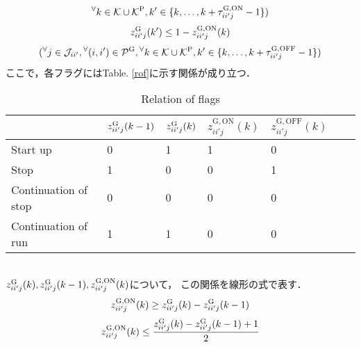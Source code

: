 \begin{itemize}
\begin{equation}
\begin{split}
			{}^{\forall} k \in \mathcal{K} \cup \mathcal{K}^{\rm P} ,%
			k' \in \{ k , \hdots , k + \tau^{\rm G,ON}_{ii'j} - 1 \} ) \nonumber
		\end{split}	
		\end{equation}
%		
		\begin{equation}
			z^{\rm G}_{ii'j}(k') \leq 1 - z_{ii'j}^{\mathrm {G,ON}} (k) 
		\end{equation}	
%		
		\begin{equation}
		\begin{split}
			( {}^{\forall} j \in \mathcal{J}_{ii'} , {}^\forall(i,i') \in \mathcal{P}^{\rm G} , %
			{}^{\forall} k \in \mathcal{K} \cup \mathcal{K}^{\rm P} ,
			k' \in \{ k , \hdots , k + \tau^{\rm G,OFF}_{ii'j} - 1 \} ) \nonumber
		\end{split}	
		\end{equation}	
%		
		ここで，各フラグにはTable. \ref{rof}に示す関係が成り立つ．
		\begin{table}[tbp]
		\begin{center}
		\caption{Relation of flags}
		\label{rof}
		\begin{tabular}{lllllll}
		\hline
 			& $z^{\rm G}_{ii'j}(k-1)$ & $z^{\rm G}_{ii'j}(k)$ & $z_{ii'j}^{\mathrm {G,ON}} (k)$ & $z_{ii'j}^{\mathrm {G,OFF}} (k)$\\ 
		\hline	
			Start up & 0 & 1 & 1 & 0\\
			Stop & 1 & 0 & 0 & 1\\
			Continuation of stop & 0 & 0 & 0 & 0\\
			Continuation of run & 1 & 1 & 0 & 0\\
		\hline	
		\end{tabular}
		\label{relation}
		\end{center}
		\end{table}				
	\\
%
%
		$z^{\rm G}_{ii'j}(k),z^{\rm G}_{ii'j}(k-1),z_{ii'j}^{\mathrm {G,ON}} (k)$について，%
		この関係を線形の式で表す．
		\begin{equation}
			 z_{ii'j}^{\mathrm {G,ON}} (k) \geq z^{\rm G}_{ii'j}(k) - z^{\rm G}_{ii'j}(k-1)
		\end{equation}
%		
		\begin{equation}	 
			z_{ii'j}^{\mathrm {G,ON}} (k) \leq \frac{z^{\rm G}_{ii'j}(k) - z^{\rm G}_{ii'j}(k-1)+1}{2}
		\end{equation}
%

\end{itemize}
